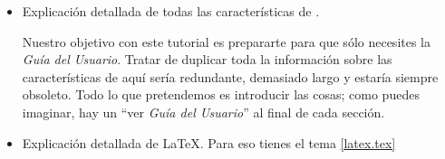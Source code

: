 \begin{itemize}






\item Explicación detallada de todas las características de \LyX{}.



Nuestro  objetivo  con  este  tutorial es  prepararte  para  que  sólo
necesites  la \emph{Guía  del  Usuario}. Tratar  de  duplicar toda  la
información sobre las características de \LyX{} aquí sería redundante,
demasiado largo y estaría siempre obsoleto. Todo lo que pretendemos es
introducir las cosas; como puedes  imaginar, hay un {}``ver \emph{Guía
del Usuario}'' al final de cada sección.

\item Explicación detallada de \LaTeX{}.  Para eso tienes el tema \ref{latex.tex}


\end{itemize}

